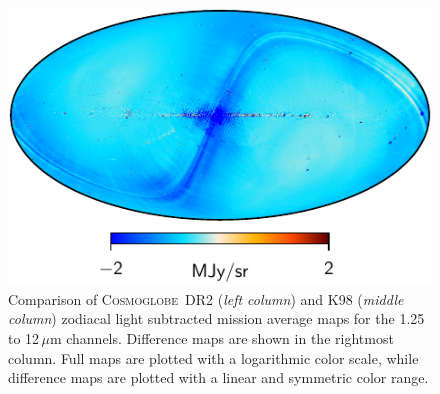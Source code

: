 \documentclass{aa}
\def\Cosmoglobe{\textsc{Cosmoglobe}}
\begin{document}
\begin{figure}
        \includegraphics[width=0.33\linewidth]{figs/diff_CG_DIRBE_ZSMA_05_n256.pdf}
	\caption{Comparison of \Cosmoglobe\ DR2 (\emph{left column}) and K98 (\emph{middle column}) zodiacal light subtracted mission average maps for the 1.25 to 12$\,\mu$m channels. Difference maps are shown in the rightmost column. Full maps are plotted with a logarithmic color scale, while difference maps are plotted with a linear and symmetric color range.}
	\label{fig:freqmaps_cg_vs_dirbe1}
\end{figure}
\end{document}
